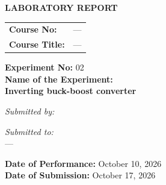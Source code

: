 \documentclass[12pt,a4paper]{article}
\begin{document}
\begin{titlepage}
    \sffamily
    \centering
    \vspace*{1cm}
    
    
    
    
    \Large \textbf{LABORATORY REPORT} \\
    \vspace{1cm}
    
    \begin{tabular}{ll}
        \textbf{Course No:} & — \\
        \textbf{Course Title:} & — \\
    \end{tabular}
    
    \vspace{2cm}
    
    \textbf{Experiment No:} 02 \\
    \vspace{0.5cm}
    \textbf{Name of the Experiment:} \\
    \Large \textbf{ Inverting buck-boost converter } \\
    
    \vspace{2.5cm}
    
    \begin{minipage}[t]{0.4\textwidth}
        \begin{flushleft} \large
            \emph{Submitted by:}\\
            
            
            
        \end{flushleft}
    \end{minipage}
    \hfill
    \begin{minipage}[t]{0.5\textwidth}
        \begin{flushright} \large
            \emph{Submitted to:} \\
            
            — \\
            
        \end{flushright}
    \end{minipage}

    \vfill
    \textbf{Date of Performance:} October 10, 2026 \\
    \textbf{Date of Submission:} October 17, 2026
    
\end{titlepage}
\end{document}
